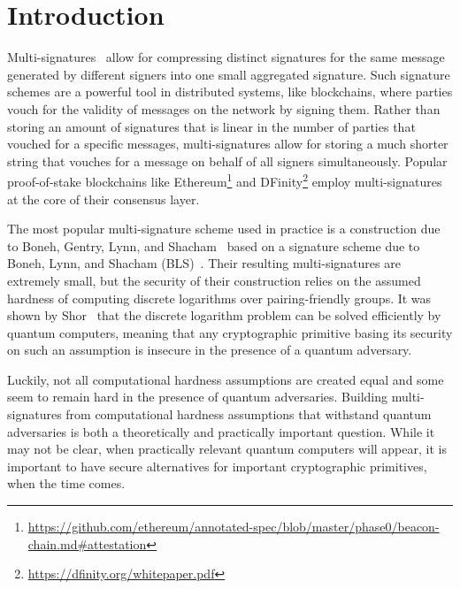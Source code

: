 \section{Introduction}\label{sec:intro}

Multi-signatures~\cite{NEC:ItaNak83,CCS:MicOhtRey01} allow for compressing distinct signatures for the same message generated by different signers into one small aggregated signature.
Such signature schemes are a powerful tool in distributed systems, like blockchains, where parties vouch for the validity of messages on the network by signing them. 
Rather than storing an amount of signatures that is linear in the number of parties that vouched for a specific messages, multi-signatures allow for storing a much shorter string that vouches for a message on behalf of all signers simultaneously.
Popular proof-of-stake blockchains like Ethereum\footnote{\url{https://github.com/ethereum/annotated-spec/blob/master/phase0/beacon-chain.md\#attestation}} and DFinity\footnote{\url{https://dfinity.org/whitepaper.pdf}} employ multi-signatures at the core of their consensus layer.

The most popular multi-signature scheme used in practice is a construction due to Boneh, Gentry, Lynn, and Shacham~\cite{EC:BGLS03} based on a signature scheme due to Boneh, Lynn, and Shacham (BLS)~\cite{AC:BonLynSha01}.
Their resulting multi-signatures are extremely small, but the security of their construction relies on the assumed hardness of computing discrete logarithms over pairing-friendly groups.
It was shown by Shor~\cite{Shor94} that the discrete logarithm problem can be solved efficiently by quantum computers, meaning that any cryptographic primitive basing its security on such an assumption is insecure in the presence of a quantum adversary.

Luckily, not all computational hardness assumptions are created equal and some seem to remain hard in the presence of quantum adversaries. 
Building multi-signatures from computational hardness assumptions that withstand quantum adversaries is both a theoretically and practically important question.
While it may not be clear, when practically relevant quantum computers will appear, it is important to have secure alternatives for important cryptographic primitives, when the time comes.

